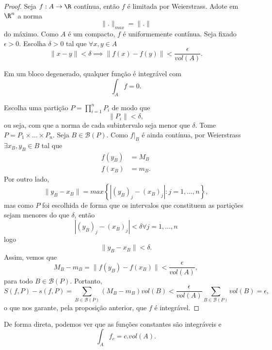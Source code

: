 \begin{proof}
    Seja $f:A\to \R$ contínua, então $f$ é limitada por Weierstrass. Adote em $\R^{n}$ a norma \[
    \|.\|_{max} = \|.\|
    \] do máximo.
    Como $A$ é um compacto, $f$ é uniformemente contínua.
    Seja fixado $\epsilon > 0$. Escolha $\delta > 0$ tal que $\forall x,y \in A$ \[
	\|x-y\|<\delta \implies \|f\left( x \right) -f\left( y \right) \|<\frac{\epsilon}{vol\left( A \right) }
    .\] 

    \begin{observe}
        Em um bloco degenerado, qualquer função é integrável com \[
        \int_A f = 0
        .\] 
    \end{observe}

    Escolha uma partição $P=\prod_{i=1}^{n} P_i  $ de modo que \[
    \|P_i\| < \delta
    ,\] ou seja, com que a norma de cada subintervalo seja menor que $\delta$. Tome $P = P_1\times \ldots\times P_n$. Seja $B \in \mathcal{B}\left( P \right) $. Como $f|_B$ é ainda contínua, por Weierstrass $\exists x_B,y_B\in B$ tal que
    \begin{align*}
	f\left( y_B \right) &= M_B \\
	f\left( x_B \right) &= m_B
    .\end{align*}
    Por outro lado, \[
    \|y_B - x_B\| = max\left\{ |\left( y_B \right)_j - \left( x_B \right)_j | : j = 1,\ldots,n \right\} 
    ,\] mas como $P$ foi escolhida de forma que os intervalos que constituem as partições sejam menores do que $\delta$, então \[
    |\left( y_B \right)_j - \left( x_B \right)_j | < \delta \forall j=1,\ldots,n
    \] logo \[
    \|y_B - x_B\| < \delta
    .\] Assim, vemos que \[
    M_B - m_B = \|f\left( y_B \right) -f\left( x_B \right) \|< \frac{\epsilon}{vol\left( A \right) }
    ,\] para todo $B\in \mathcal{B}\left( P \right) $. Portanto, \[
    S\left( f, P \right) - s\left( f, P \right) = \sum_{B\in \mathcal{B}\left( P \right) } \left( M_B - m_B \right) vol\left( B \right) <\frac{\epsilon}{vol\left( A \right) } \sum_{B\in \mathcal{B}\left( P \right) } vol\left( B \right) = \epsilon
    ,\] o que nos garante, pela proposição anterior, que $f$ é integrável.
\end{proof}

De forma direta, podemos ver que as funções constantes são integráveis e \[
\int_A f_c = c . vol\left( A \right) 
.\] 

